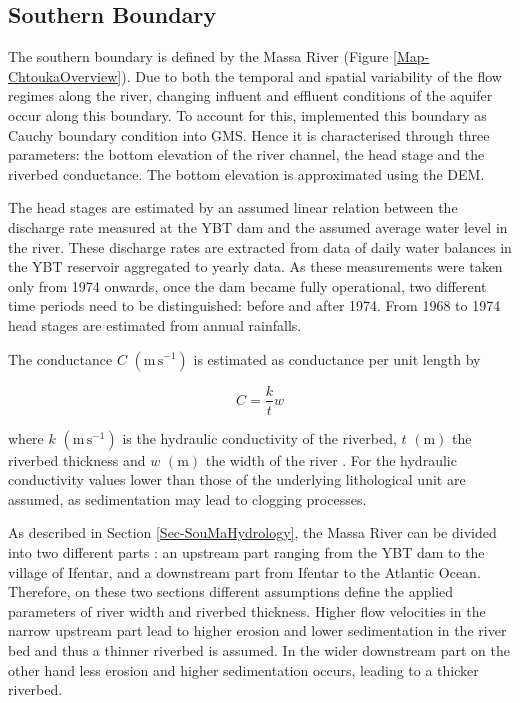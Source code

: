 \subsection{Southern Boundary}

The southern boundary is defined by the Massa River (Figure \ref{Map-ChtoukaOverview}). 
Due to both the temporal and spatial variability of the flow regimes along the river, changing influent and effluent conditions of the aquifer occur along this boundary. 
To account for this, \cite{Horn.2021} implemented this boundary as Cauchy boundary condition into GMS. 
Hence it is characterised through three parameters: the bottom elevation of the river channel, the head stage and the riverbed conductance. 
The bottom elevation is approximated using the DEM.

The head stages are estimated by an assumed linear relation between the discharge rate measured at the YBT dam and the assumed average water level in the river. 
These discharge rates are extracted from data of daily water balances in the YBT reservoir aggregated to yearly data. 
As these measurements were taken only from 1974 onwards, once the dam became fully operational, two different time periods need to be distinguished: before and after 1974. 
From 1968 to 1974 head stages are estimated from annual rainfalls.

The conductance $C$ $\left( \textrm{m} \, \textrm{s}^{-1} \right)$ is estimated as conductance per unit length by

\begin{equation}
    C = \frac{k}{t} w
\end{equation}

where $k$ $\left( \textrm{m} \, \textrm{s}^{-1} \right)$ is the hydraulic conductivity of the riverbed, $t$ $\left( \textrm{m} \right)$ the riverbed thickness and $w$ $\left( \textrm{m}\right)$ the width of the river \parencite{Aquaveo.2019}. 
For the hydraulic conductivity values lower than those of the underlying lithological unit are assumed, as sedimentation may lead to clogging processes.

As described in Section \ref{Sec-SouMaHydrology}, the Massa River can be divided into two different parts \parencite{Horn.2021}: an upstream part ranging from the YBT dam to the village of Ifentar, and a downstream part from Ifentar to the Atlantic Ocean. 
Therefore, on these two sections different assumptions define the applied parameters of river width and riverbed thickness. 
Higher flow velocities in the narrow upstream part lead to higher erosion and lower sedimentation in the river bed and thus a thinner riverbed is assumed. 
In the wider downstream part on the other hand less erosion and higher sedimentation occurs, leading to a thicker riverbed.


